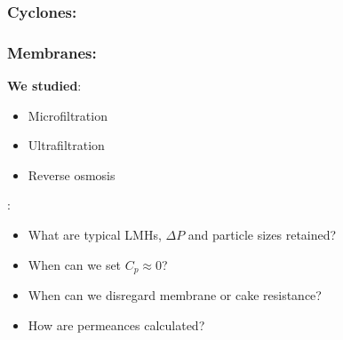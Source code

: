 {
\begin{frame}\frametitle{Cyclones: {}}
\end{frame}}

{
\begin{frame}\frametitle{Membranes: {}}
	\textbf{We studied}:
	\begin{itemize}
		\item	Microfiltration
		\item	Ultrafiltration
		\item	Reverse osmosis
	\end{itemize}
	
	\vspace{3cm}
	\emph{{\color{myGreen}{Some things to consider}}}:
	\begin{itemize}
		\item	What are typical LMHs, $\Delta P$ and particle sizes retained?
		\item	When can we set $C_p \approx 0$?
		\item	When can we disregard membrane or cake resistance?
		\item	How are permeances calculated?
	\end{itemize}
\end{frame}}

